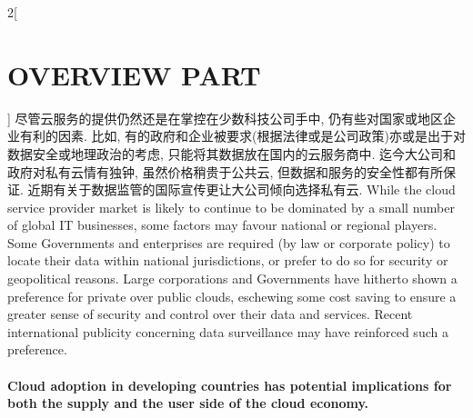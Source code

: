 \documentclass[a4paper, UTF8, 12pt]{article}
\begin{document}
\begin{paracol}{2}[\section{OVERVIEW PART\uppercase\expandafter{}}]
    \switchcolumn*
    尽管云服务的提供仍然还是在掌控在少数科技公司手中, 仍有些对国家或地区企业有利的因素. 比如, 有的政府和企业被要求(根据法律或是公司政策)亦或是出于对数据安全或地理政治的考虑, 只能将其数据放在国内的云服务商中. 迄今大公司和政府对私有云情有独钟, 虽然价格稍贵于公共云, 但数据和服务的安全性都有所保证. 近期有关于数据监管的国际宣传更让大公司倾向选择私有云.
    \switchcolumn
    While the cloud service provider market is likely to continue to be dominated by a small number of global IT businesses, some factors may favour national or regional players. Some Governments and enterprises are required (by law or corporate policy) to locate their data within national jurisdictions, or prefer to do so for security or geopolitical reasons. Large corporations and Governments have hitherto shown a preference for private over public clouds, eschewing some cost saving to ensure a greater sense of security and control over their data and services. Recent international publicity concerning data surveillance may have reinforced such a preference. 
    
    \switchcolumn*
    \paragraph{} 
    \switchcolumn
    \paragraph{}
    {\bfseries Cloud adoption in developing countries has potential implications for both the supply and the user side of the cloud economy.} 
    

\end{paracol}
\end{document}
